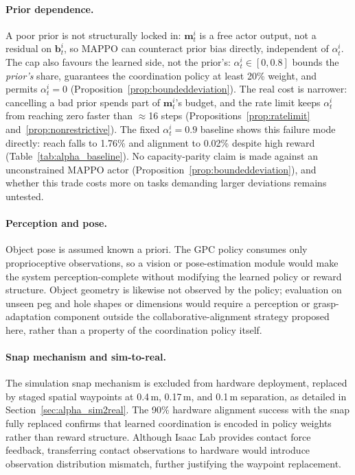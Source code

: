 \paragraph{Prior dependence.} A poor prior is not structurally locked in: $\mathbf{m}_t^i$ is a free
actor output, not a residual on $\mathbf{b}_t^i$, so MAPPO can counteract prior bias directly,
independent of $\alpha_t^i$. The cap also favours the learned side, not the prior's: $\alpha_t^i \in
[0,0.8]$ bounds the \emph{prior's} share, guarantees the coordination policy at least 20\% weight, and
permits $\alpha_t^i = 0$ (Proposition~\ref{prop:boundeddeviation}). The real cost is narrower:
cancelling a bad prior spends part of $\mathbf{m}_t^i$'s budget, and the rate limit keeps $\alpha_t^i$
from reaching zero faster than $\approx$16 steps (Propositions~\ref{prop:ratelimit}
and~\ref{prop:nonrestrictive}). The fixed $\alpha_t^i = 0.9$ baseline shows this failure mode directly:
reach falls to 1.76\% and alignment to 0.02\% despite high reward (Table~\ref{tab:alpha_baseline}). No
capacity-parity claim is made against an unconstrained MAPPO actor
(Proposition~\ref{prop:boundeddeviation}), and whether this trade costs more on tasks demanding larger
deviations remains untested.

\paragraph{Perception and pose.} Object pose is assumed known a priori. The GPC policy consumes only
proprioceptive observations, so a vision or pose-estimation module would make the system
perception-complete without modifying the learned policy or reward structure. Object geometry is
likewise not observed by the policy; evaluation on unseen peg and hole shapes or dimensions would
require a perception or grasp-adaptation component outside the collaborative-alignment strategy
proposed here, rather than a property of the coordination policy itself.

\paragraph{Snap mechanism and sim-to-real.} The simulation snap mechanism is excluded from hardware
deployment, replaced by staged spatial waypoints at 0.4\,m, 0.17\,m, and 0.1\,m separation, as detailed
in Section~\ref{sec:alpha_sim2real}. The 90\% hardware alignment success with the snap fully replaced
confirms that learned coordination is encoded in policy weights rather than reward structure. Although
Isaac Lab provides contact force feedback, transferring contact observations to hardware would
introduce observation distribution mismatch, further justifying the waypoint replacement.

